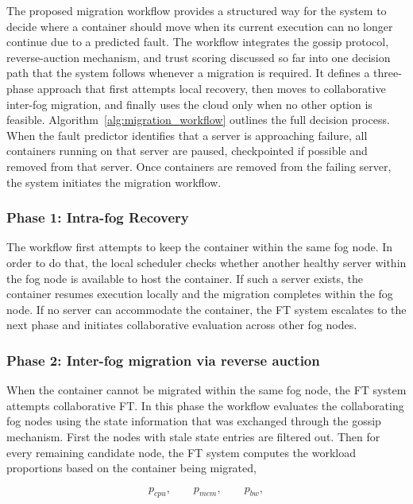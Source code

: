 \documentclass{article}
\begin{document}
The proposed migration workflow provides a structured way for the system to decide where a container should move when its current execution can no longer continue due to a predicted fault. The workflow integrates the gossip protocol, reverse-auction mechanism, and trust scoring discussed so far into one decision path that the system follows whenever a migration is required. It defines a three-phase approach that first attempts local recovery, then moves to collaborative inter-fog migration, and finally uses the cloud only when no other option is feasible. Algorithm~\ref{alg:migration_workflow} outlines the full decision process. When the fault predictor identifies that a server is approaching failure, all containers running on that server are paused, checkpointed if possible and removed from that server. Once containers are removed from the failing server, the system initiates the migration workflow.

\subsubsection{Phase 1: Intra-fog Recovery}

The workflow first attempts to keep the container within the same fog node. In order to do that, the local scheduler checks whether another healthy server within the fog node is available to host the container. If such a server exists, the container resumes execution locally and the migration completes within the fog node. If no server can accommodate the container, the FT system escalates to the next phase and initiates collaborative evaluation across other fog nodes.

\subsubsection{Phase 2: Inter-fog migration via reverse auction}

When the container cannot be migrated within the same fog node, the FT system attempts collaborative FT. In this phase the workflow evaluates the collaborating fog nodes using the state information that was exchanged through the gossip mechanism. First the nodes with stale state entries are filtered out. Then for every remaining candidate node, the FT system computes the workload proportions based on the container being migrated,

\begin{equation}
p_{cpu}, \qquad p_{mem}, \qquad p_{bw},
\label{eq:prop_contrib}
\end{equation}
\end{document}
